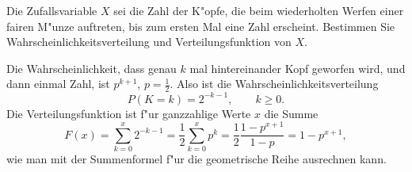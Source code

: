 Die Zufallsvariable $X$ sei die Zahl der K"opfe, die beim
wiederholten Werfen einer fairen M"unze auftreten, bis zum
ersten Mal eine Zahl erscheint. Bestimmen Sie Wahrscheinlichkeitsverteilung
und Verteilungsfunktion von $X$.

\begin{loesung}
Die Wahrscheinlichkeit, dass genau $k$ mal hintereinander Kopf geworfen
wird, und dann einmal Zahl, ist $p^{k+1}$, $p=\frac12$. Also ist die
Wahrscheinlichkeitsverteilung
\[
P(K=k)=2^{-k-1},\qquad k\ge 0.
\]
Die Verteilungsfunktion ist f"ur ganzzahlige Werte $x$ die Summe
\[
F(x)=\sum_{k=0}^x2^{-k-1}=\frac12\sum_{k=0}^x p^k=\frac12 \frac{1-p^{x+1}}{1-p}
=1-p^{x+1},
\]
wie man mit der Summenformel f"ur die geometrische Reihe ausrechnen kann.
\end{loesung}

